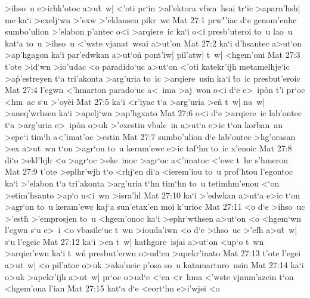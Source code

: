 >ihso~u
e>irhk'otoc
a>u\r{t}~w|
<'oti
pr`in
>al'ektora
vfwn~hsai
tr`ic
>aparn'hsh|
me
ka`i
>exelj`wn
>'exw
>'eklausen
pikr~wc\bibvsend
\vs Mat 27:1
prw"'iac
d`e
genom'enhc
sumbo'ulion
>'elabon
p'antec
o<i
>arqiere~ic
ka`i
o<i
presb'uteroi
to~u
lao~u
kat`a
to~u
>ihso~u
<'wste
vjanat~wsai
a>ut'on\bibvsend
\vs Mat 27:2
ka`i
d'hsantec
a>ut`on
>ap'hgagon
ka`i
par'edwkan
a>ut`on\r{}
pont'iw|
pil'atw|
t~w|
<hgem'oni\bibvsend
\vs Mat 27:3
t'ote
>id`wn
>io'udac
<o
paradido`uc
a>ut`on
<'oti
katekr'ijh
metamelhje`ic
>a\r{p}'estreyen
t`a
tri'akonta
>arg'uria
to~ic
>arqiere~usin
ka`i
\r{t}o~ic
presbut'eroic\bibvsend
\vs Mat 27:4
l'egwn
<'hmarton
parado`uc
a<~ima
>aj~won
o<i
d`e
e>~ip\r{o}n
t'i
pr`oc
<hm~ac
s`u
>'oy\r{e}i\bibvsend
{}
\vs Mat 27:5
ka`i
<r'iyac
t`a
>arg'uria
>en\r{}
t~w|
na~w|
>aneq'wrhsen
ka`i
>apelj`wn
>ap'hgxato\bibvsend
\vs Mat 27:6
o<i
d`e
>arqiere~ic
lab'ontec
t`a
>arg'uria
e>~ip\r{o}n
o>uk
>'exestin
vbale~in
a>ut`a
e>ic
t`on
korban~an
>epe`i
tim`h
a<'imat'oc
>estin\bibvsend
\vs Mat 27:7
sumbo'ulion
d`e
lab'ontec
>hg'orasan
>ex
a>ut~wn
t`on
>agr`on
to~u
keram'ewc
e>ic
taf`hn
to~ic
x'enoic\bibvsend
\vs Mat 27:8
di`o
>ekl'hjh
<o
>agr`oc
>eke~inoc
>agr`oc
a<'imatoc
<'ewc
t~hc
s'hmeron\bibvsend
\vs Mat 27:9
t'ote
>eplhr'wjh
t`o
<rhj`en
di`a
<ierem'iou
to~u
prof'htou
l'egontoc
ka`i
>'elabon
t`a
tri'akonta
>arg'uria
t`hn
tim`hn
to~u
tetimhm'enou
<`on
>etim'hsanto
>ap`o
u<i~wn
>isra'hl\bibvsend
\vs Mat 27:10
ka`i
>'edwkan
a>ut`a
e>ic
t`on
>agr`on
to~u
keram'ewc
kaj`a
sun'etax'en
moi
k'urioc\bibvsend
\vs Mat 27:11
<o
d`e
>ihso~uc
>'est\r{h}
>'emprosjen
to~u
<hgem'onoc
ka`i
>ephr'wthsen
a>ut`on
<o
<hgem`wn
l'egwn
s`u
e>~i
<o
vbasile`uc
t~wn
>iouda'iwn
<o
d`e
>ihso~uc
>'efh
a>u\r{t}~w|
s`u
l'egeic\bibvsend
\vs Mat 27:12
ka`i
>en
t~w|
kathgore~isjai
a>ut`on
<up`o
t~wn
>arqier'ewn
ka`i
t~w\r{n}
presbut'erwn
o>ud`en
>apekr'inato\bibvsend
\vs Mat 27:13
t'ote
l'egei
a>ut~w|
<o
pil'atoc
o>uk
>ako'ueic
p'osa
so~u
katamarturo~usin\bibvsend
\vs Mat 27:14
ka`i
o>uk
>apekr'ijh
a>ut~w|
pr`oc
o>ud`e
<`en
<r~hma
<'wste
vjaum'azein
t`on
<hgem'ona
l'ian\bibvsend
\vs Mat 27:15
kat`a
d`e
<eort`hn
e>i'wjei
<o
